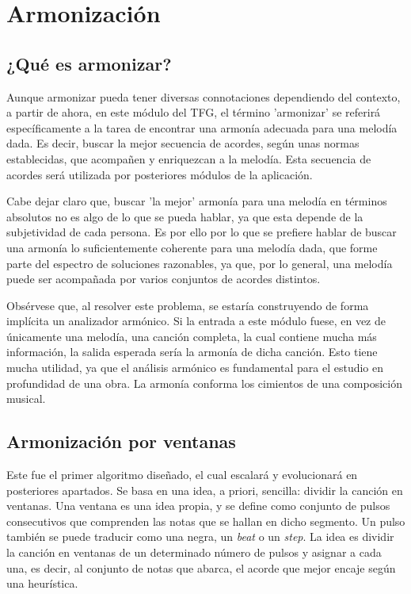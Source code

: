 \chapter{Armonización}
\label{cap:armonizacion}

\section{¿Qué es armonizar?}
\label{sec:arm:cuestion}    

    Aunque armonizar pueda tener diversas connotaciones dependiendo del contexto, a partir de ahora, en este módulo del TFG, el término 'armonizar' se referirá específicamente a la tarea de encontrar una armonía adecuada para una melodía dada. Es decir, buscar la mejor secuencia de acordes, según unas normas establecidas, que acompañen y enriquezcan a la melodía. Esta secuencia de acordes será utilizada por posteriores módulos de la aplicación.

    Cabe dejar claro que, buscar 'la mejor' armonía para una melodía en términos absolutos no es algo de lo que se pueda hablar, ya que esta depende de la subjetividad de cada persona. Es por ello por lo que se prefiere hablar de buscar una armonía lo suficientemente coherente para una melodía dada, que forme parte del espectro de soluciones razonables, ya que, por lo general, una melodía puede ser acompañada por varios conjuntos de acordes distintos.

    Obsérvese que, al resolver este problema, se estaría construyendo de forma implícita un analizador armónico. Si la entrada a este módulo fuese, en vez de únicamente una melodía, una canción completa, la cual contiene mucha más información, la salida esperada sería la armonía de dicha canción. Esto tiene mucha utilidad, ya que el análisis armónico es fundamental para el estudio en profundidad de una obra. La armonía conforma los cimientos de una composición musical. 

\section{Armonización por ventanas}\label{arm:sec:ventanas_normal}

    Este fue el primer algoritmo diseñado, el cual escalará y evolucionará en posteriores apartados. Se basa en una idea, a priori, sencilla: dividir la canción en ventanas. Una ventana es una idea propia, y se define como conjunto de pulsos consecutivos que comprenden las notas que se hallan en dicho segmento. Un pulso también se puede traducir como una negra, un \textit{beat} o un \textit{step}. La idea es dividir la canción en ventanas de un determinado número de pulsos y asignar a cada una, es decir, al conjunto de notas que abarca, el acorde que mejor encaje según una heurística.

